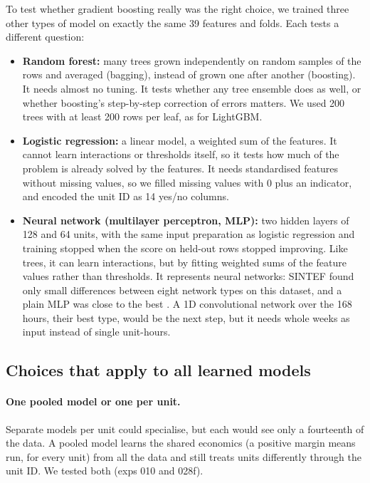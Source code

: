 To test whether gradient boosting really was the right choice, we trained three other types of model on exactly the same 39 features and folds. Each tests a different question:
\begin{itemize}
  \item \textbf{Random forest:} many trees grown independently on random samples of the rows and averaged (bagging), instead of grown one after another (boosting). It needs almost no tuning. It tests whether any tree ensemble does as well, or whether boosting's step-by-step correction of errors matters. We used 200 trees with at least 200 rows per leaf, as for LightGBM.
  \item \textbf{Logistic regression:} a linear model, a weighted sum of the features. It cannot learn interactions or thresholds itself, so it tests how much of the problem is already solved by the features. It needs standardised features without missing values, so we filled missing values with 0 plus an indicator, and encoded the unit ID as 14 yes/no columns.
  \item \textbf{Neural network (multilayer perceptron, MLP):} two hidden layers of 128 and 64 units, with the same input preparation as logistic regression and training stopped when the score on held-out rows stopped improving. Like trees, it can learn interactions, but by fitting weighted sums of the feature values rather than thresholds. It represents neural networks: SINTEF found only small differences between eight network types on this dataset, and a plain MLP was close to the best \citep{barjaktarevic2026}. A 1D convolutional network over the 168 hours, their best type, would be the next step, but it needs whole weeks as input instead of single unit-hours.
\end{itemize}

\subsection{Choices that apply to all learned models}\label{sec:5.design}

\paragraph{One pooled model or one per unit.} Separate models per unit could specialise, but each would see only a fourteenth of the data. A pooled model learns the shared economics (a positive margin means run, for every unit) from all the data and still treats units differently through the unit ID. We tested both (exps 010 and 028f).

